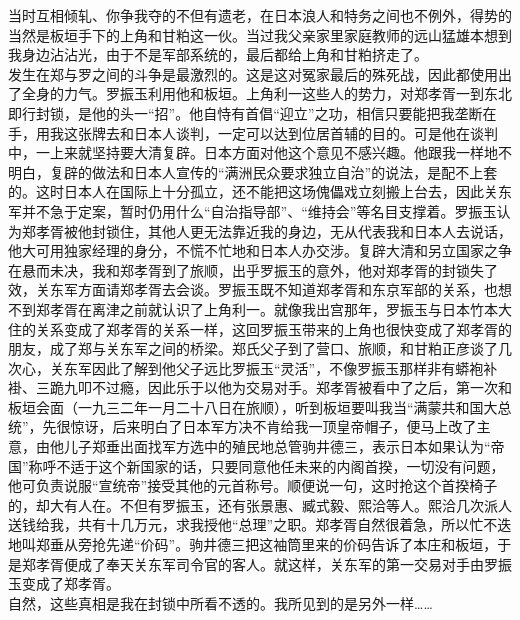 当时互相倾轧、你争我夺的不但有遗老，在日本浪人和特务之间也不例外，得势的当然是板垣手下的上角和甘粕这一伙。当过我父亲家里家庭教师的远山猛雄本想到我身边沾沾光，由于不是军部系统的，最后都给上角和甘粕挤走了。\\

发生在郑与罗之间的斗争是最激烈的。这是这对冤家最后的殊死战，因此都使用出了全身的力气。罗振玉利用他和板垣。上角利一这些人的势力，对郑孝胥一到东北即行封锁，是他的头一“招”。他自恃有首倡“迎立”之功，相信只要能把我垄断在手，用我这张牌去和日本人谈判，一定可以达到位居首辅的目的。可是他在谈判中，一上来就坚持要大清复辟。日本方面对他这个意见不感兴趣。他跟我一样地不明白，复辟的做法和日本人宣传的“满洲民众要求独立自治”的说法，是配不上套的。这时日本人在国际上十分孤立，还不能把这场傀儡戏立刻搬上台去，因此关东军并不急于定案，暂时仍用什么“自治指导部”、“维持会”等名目支撑着。罗振玉认为郑孝胥被他封锁住，其他人更无法靠近我的身边，无从代表我和日本人去说话，他大可用独家经理的身分，不慌不忙地和日本人办交涉。复辟大清和另立国家之争在悬而未决，我和郑孝胥到了旅顺，出乎罗振玉的意外，他对郑孝胥的封锁失了效，关东军方面请郑孝胥去会谈。罗振玉既不知道郑孝胥和东京军部的关系，也想不到郑孝胥在离津之前就认识了上角利一。就像我出宫那年，罗振玉与日本竹本大住的关系变成了郑孝胥的关系一样，这回罗振玉带来的上角也很快变成了郑孝胥的朋友，成了郑与关东军之间的桥梁。郑氏父子到了营口、旅顺，和甘粕正彦谈了几次心，关东军因此了解到他父子远比罗振玉“灵活”，不像罗振玉那样非有蟒袍补褂、三跪九叩不过瘾，因此乐于以他为交易对手。郑孝胥被看中了之后，第一次和板垣会面（一九三二年一月二十八日在旅顺），听到板垣要叫我当“满蒙共和国大总统”，先很惊讶，后来明白了日本军方决不肯给我一顶皇帝帽子，便马上改了主意，由他儿子郑垂出面找军方选中的殖民地总管驹井德三，表示日本如果认为“帝国”称呼不适于这个新国家的话，只要同意他任未来的内阁首揆，一切没有问题，他可负责说服“宣统帝”接受其他的元首称号。顺便说一句，这时抢这个首揆椅子的，却大有人在。不但有罗振玉，还有张景惠、臧式毅、熙洽等人。熙洽几次派人送钱给我，共有十几万元，求我授他“总理”之职。郑孝胥自然很着急，所以忙不迭地叫郑垂从旁抢先递“价码”。驹井德三把这袖筒里来的价码告诉了本庄和板垣，于是郑孝胥便成了奉天关东军司令官的客人。就这样，关东军的第一交易对手由罗振玉变成了郑孝胥。\\

自然，这些真相是我在封锁中所看不透的。我所见到的是另外一样……\\